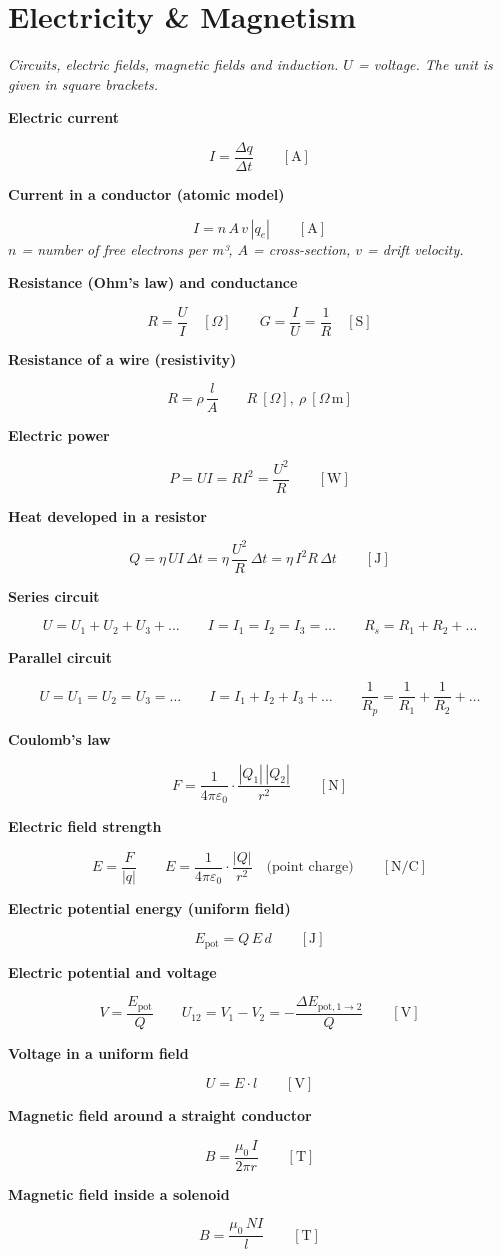\documentclass[11pt]{article}
\newcommand{\sect}[2]{\section*{\color{#1}#2}}
\newcommand{\sub}[1]{\par\medskip\textbf{#1}\par}
\newcommand{\expl}[1]{{\color{gray}\itshape #1}\par}
\begin{document}
\sect{cEM}{Electricity \& Magnetism}
\expl{Circuits, electric fields, magnetic fields and induction. $U$ = voltage. The unit is given in square brackets.}

\sub{Electric current}
\[ I = \frac{\Delta q}{\Delta t} \qquad [\mathrm{A}] \]

\sub{Current in a conductor (atomic model)}
\[ I = n\,A\,v\,|q_e| \qquad [\mathrm{A}] \]
\expl{$n$ = number of free electrons per m³, $A$ = cross-section, $v$ = drift velocity.}

\sub{Resistance (Ohm's law) and conductance}
\[ R = \frac{U}{I} \quad [\Omega] \qquad G = \frac{I}{U} = \frac{1}{R} \quad [\mathrm{S}] \]

\sub{Resistance of a wire (resistivity)}
\[ R = \rho\,\frac{l}{A} \qquad R\ [\Omega],\ \rho\ [\Omega\,\mathrm{m}] \]

\sub{Electric power}
\[ P = U I = R I^2 = \frac{U^2}{R} \qquad [\mathrm{W}] \]

\sub{Heat developed in a resistor}
\[ Q = \eta\,U I\,\Delta t = \eta\,\frac{U^2}{R}\,\Delta t = \eta\,I^2 R\,\Delta t \qquad [\mathrm{J}] \]

\sub{Series circuit}
\[ U = U_1 + U_2 + U_3 + \dots \qquad I = I_1 = I_2 = I_3 = \dots \qquad R_s = R_1 + R_2 + \dots \]

\sub{Parallel circuit}
\[ U = U_1 = U_2 = U_3 = \dots \qquad I = I_1 + I_2 + I_3 + \dots \qquad \frac{1}{R_p} = \frac{1}{R_1} + \frac{1}{R_2} + \dots \]

\sub{Coulomb's law}
\[ F = \frac{1}{4\pi\varepsilon_0}\cdot\frac{|Q_1|\,|Q_2|}{r^2} \qquad [\mathrm{N}] \]

\sub{Electric field strength}
\[ E = \frac{F}{|q|} \qquad E = \frac{1}{4\pi\varepsilon_0}\cdot\frac{|Q|}{r^2} \quad \text{(point charge)} \qquad [\mathrm{N/C}] \]

\sub{Electric potential energy (uniform field)}
\[ E_{\text{pot}} = Q\,E\,d \qquad [\mathrm{J}] \]

\sub{Electric potential and voltage}
\[ V = \frac{E_{\text{pot}}}{Q} \qquad U_{12} = V_1 - V_2 = -\frac{\Delta E_{\text{pot},1\to 2}}{Q} \qquad [\mathrm{V}] \]

\sub{Voltage in a uniform field}
\[ U = E\cdot l \qquad [\mathrm{V}] \]

\sub{Magnetic field around a straight conductor}
\[ B = \frac{\mu_0\,I}{2\pi r} \qquad [\mathrm{T}] \]

\sub{Magnetic field inside a solenoid}
\[ B = \frac{\mu_0\,N I}{l} \qquad [\mathrm{T}] \]
\end{document}
